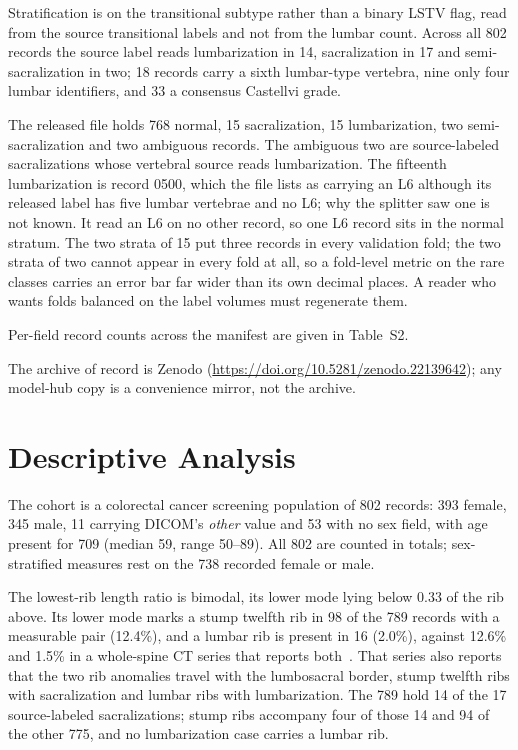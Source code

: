 \documentclass[aapm,mph,amsmath,amssymb,preprint,linenumbers]{revtex4-2}
\newcommand{\datasetdoi}{10.5281/zenodo.22139642}
\newcommand{\doiurl}[1]{\url{https://doi.org/#1}}
\begin{document}
Stratification is on the transitional subtype rather than a binary LSTV flag, read from the
source transitional labels and not from the lumbar count. Across all 802 records the source
label reads lumbarization in 14, sacralization in 17 and semi-sacralization in two; 18
records carry a sixth lumbar-type vertebra, nine only four lumbar identifiers, and 33 a
consensus Castellvi grade.

The released file holds 768 normal, 15 sacralization, 15 lumbarization, two
semi-\hspace{0pt}sacralization and two ambiguous records. The ambiguous two are source-labeled
sacralizations whose vertebral source reads lumbarization. The fifteenth lumbarization is
record 0500, which the file lists as carrying an L6 although its released label has five
lumbar vertebrae and no L6; why the splitter saw one is not known. It read an L6 on no other
record, so one L6 record sits in the normal stratum. The two strata of 15 put three records
in every validation fold; the two strata of two cannot appear in every fold at all, so a
fold-level metric on the rare classes carries an error bar far wider than its own decimal
places. A reader who wants folds balanced on the label volumes must regenerate them.

Per-field record counts across the manifest are given in Table~S2.

The archive of record is Zenodo (\doiurl{\datasetdoi}); any model-hub copy is a convenience
mirror, not the archive.

\section{Descriptive Analysis}
\label{sec:descriptive}


The cohort is a colorectal cancer screening population of 802 records: 393 female, 345 male,
11 carrying DICOM's \emph{other} value and 53 with no sex field, with age present for 709
(median 59, range 50--89). All 802 are counted in totals; sex-stratified measures rest on the
738 recorded female or male.

The lowest-rib length ratio is bimodal,
its lower mode lying below 0.33 of the rib above. Its lower mode marks a stump twelfth rib in 98 of the 789 records with a measurable pair
(12.4\%), and a lumbar rib is present in 16 (2.0\%), against 12.6\% and 1.5\% in a
whole-spine CT series that reports both~\cite{nagata2025}. That series also reports that the
two rib anomalies travel with the lumbosacral border, stump twelfth ribs with sacralization
and lumbar ribs with lumbarization. The 789 hold 14 of the 17 source-labeled
sacralizations; stump ribs accompany four of those 14 and 94 of the other 775, and no
lumbarization case carries a lumbar rib.
\end{document}
